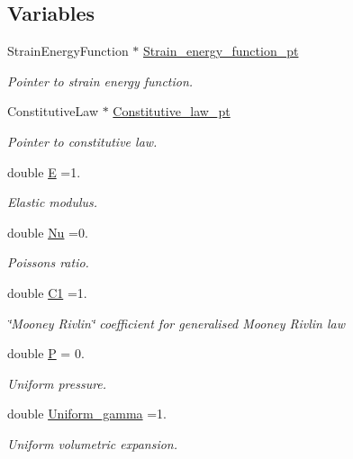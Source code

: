 \subsection*{Variables}
\begin{DoxyCompactItemize}
\item 
Strain\+Energy\+Function $\ast$ \hyperlink{namespaceGlobal__Physical__Variables_a73135f793690b4386bf83bbefc7bf310}{Strain\+\_\+energy\+\_\+function\+\_\+pt}
\begin{DoxyCompactList}\small\item\em Pointer to strain energy function. \end{DoxyCompactList}\item 
Constitutive\+Law $\ast$ \hyperlink{namespaceGlobal__Physical__Variables_a2a37fb040c832ee7a086bb13bb02a100}{Constitutive\+\_\+law\+\_\+pt}
\begin{DoxyCompactList}\small\item\em Pointer to constitutive law. \end{DoxyCompactList}\item 
double \hyperlink{namespaceGlobal__Physical__Variables_a09a019474b7405b35da2437f7779bc7e}{E} =1.
\begin{DoxyCompactList}\small\item\em Elastic modulus. \end{DoxyCompactList}\item 
double \hyperlink{namespaceGlobal__Physical__Variables_a3962c36313826b19f216f6bbbdd6a477}{Nu} =0.
\begin{DoxyCompactList}\small\item\em Poisson\textquotesingle{}s ratio. \end{DoxyCompactList}\item 
double \hyperlink{namespaceGlobal__Physical__Variables_a849754fa7155c1a31481674ce4845658}{C1} =1.
\begin{DoxyCompactList}\small\item\em \char`\"{}\+Mooney Rivlin\char`\"{} coefficient for generalised Mooney Rivlin law \end{DoxyCompactList}\item 
double \hyperlink{namespaceGlobal__Physical__Variables_a23c2ade6398f54040b869f7f3a2bcc4b}{P} = 0.
\begin{DoxyCompactList}\small\item\em Uniform pressure. \end{DoxyCompactList}\item 
double \hyperlink{namespaceGlobal__Physical__Variables_ae02b5f5b098b05fba75f3b61f381c5f7}{Uniform\+\_\+gamma} =1.
\begin{DoxyCompactList}\small\item\em Uniform volumetric expansion. \end{DoxyCompactList}\end{DoxyCompactItemize}


